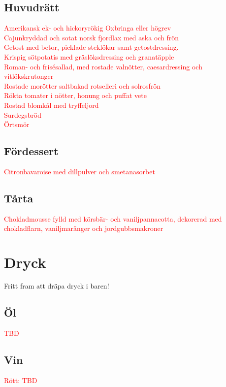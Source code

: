 \documentclass[a5paper]{article}
\begin{document}
	\subsection*{Huvudrätt}

		
	\begin{spacing}{1.3}
\textcolor{red}{
		Amerikansk ek- och hickoryrökig Oxbringa eller högrev \\ 
		Cajunkryddad och sotat norsk fjordlax med aska och frön \\
		Getost med betor, picklade steklökar samt getostdressing. \\
		Krispig sötpotatis med gräslöksdressing och granatäpple \\
		Roman- och frisésallad, med rostade valnötter, caesardressing och vitlökskrutonger \\
		Rostade morötter saltbakad rotselleri och solrosfrön \\
		Rökta tomater i nötter, honung och puffat vete \\
		Rostad blomkål med tryffeljord  \\
		Surdegsbröd \\
		Örtsmör \\
}
	\end{spacing}	

		\subsection*{Fördessert}
\textcolor{red}{
		Citronbavaroise med dillpulver och smetanasorbet
}		
		\subsection*{Tårta}

		\begin{spacing}{1.3}
\textcolor{red}{
		Chokladmousse fylld med körsbär- och vaniljpannacotta, dekorerad med chokladflarn, vaniljmaränger och jordgubbsmakroner
}
		\end{spacing}

	
	\newpage
	\section{Dryck}
	Fritt fram att dräpa dryck i baren!
		
	\subsection*{Öl}
\textcolor{red}{
	TBD
}	
	\subsection*{Vin}
\textcolor{red}{
	Rött: 
	TBD
}
\end{document}
